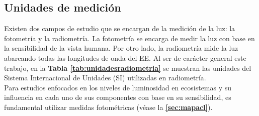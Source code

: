 \newpage

\subsection{Unidades de medición}

Existen dos campos de estudio que se encargan de la medición de la luz: la fotometría y la radiometría. La fotometría se encarga de medir la luz con base en la sensibilidad de la vista humana. Por otro lado, la radiometría mide la luz abarcando todas las longitudes de onda del EE. Al ser de carácter general este trabajo, en la \textbf{Tabla \ref{tab:unidadesradiometria}} se muestran las unidades del Sistema Internacional de Unidades (SI) utilizadas en radiometría.\\

Para estudios enfocados en los niveles de luminosidad en ecosistemas y su influencia en cada uno de sus componentes con base en su sensibilidad, es fundamental utilizar medidas fotométricas (véase la \textbf{\autoref{sec:mapacl}}).


\begin{table}[htb]
\centering
\caption{Unidades del SI utilizadas en radiometría \citep{Jurgen1968}}
\label{tab:unidadesradiometria}
\end{table}

\newpage

